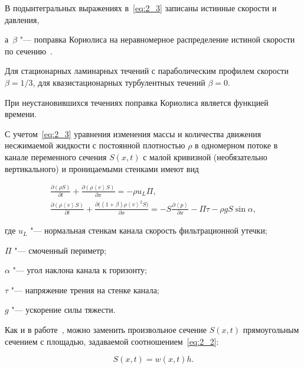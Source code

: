 В подынтегральных выражениях в~\eqref{eq:2_3} записаны истинные скорости и давления, 

а~$\beta$ "--- поправка Кориолиса на неравномерное распределение истиной скорости по сечению~\cite{Charniy1}. 

Для стационарных ламинарных течений с параболическим профилем скорости $\beta = {1}/{3}$, для квазистационарных турбулентных течений $\beta = 0$. 

При неустановившихся течениях поправка Кориолиса является функцией времени.



С учетом~\eqref{eq:2_3} уравнения изменения массы и количества движения несжимаемой жидкости с постоянной плотностью $\rho$ в одномерном потоке в канале переменного сечения $S(x, t)$ с малой кривизной (необязательно вертикального) и проницаемыми стенками имеют вид

\begin{gather}

 \frac{\partial \left(\rho S\right)}{\partial t} + \frac{\partial \left(\rho \left\langle v\right\rangle  S\right)}{\partial x} = - \rho u_L \Pi, \label{eq:2_4} \\

 \frac{\partial \left(\rho \left\langle v\right\rangle  S\right)}{\partial t} + 

 \frac{\partial \bigl(\left(1+\beta\right) \rho \left\langle v\right\rangle^2 S\bigr)}{\partial x} = 

-S \frac{\partial \left\langle p\right\rangle}{\partial x} - \Pi \tau - \rho g S \sin \alpha, \label{eq:2_5}

\end{gather}

где $u_L$ "--- нормальная стенкам канала скорость фильтрационной утечки; 

$\Pi$ "--- смоченный периметр; 

$\alpha$ "--- угол наклона канала к горизонту; 

$\tau$ "--- напряжение трения на стенке канала; 

$g$ "--- ускорение силы тяжести. 

Как и в работе~\cite{Iv_Sm1}, можно заменить произвольное сечение $S(x, t)$ прямоугольным сечением с площадью, задаваемой соотношением~\eqref{eq:2_2}:

\begin{equation}

S(x, t) = w(x, t)h .\label{eq:2_6}

\end{equation}



